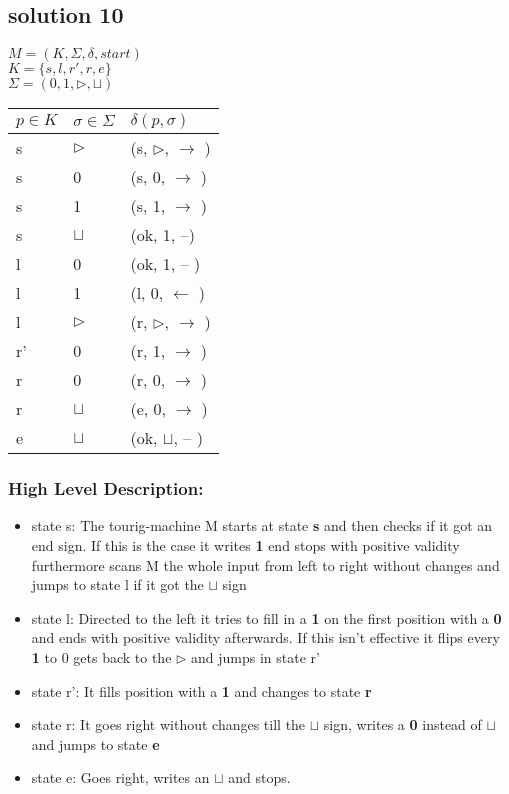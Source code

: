 \subsection{solution 10}

$M=(K,\Sigma, \delta, start)$\\
$K=\{s, l, r', r, e\}$\\
$\Sigma=(0,1,\triangleright, \sqcup)$

\begin{center}
\begin{tabular}[t]{| l | l | l |}
\hline
$p \in K$ & $\sigma \in \Sigma $ & $ \delta ( p, \sigma ) $ \\ \hline
s & $\triangleright$ & (s, $\triangleright$, $\rightarrow$ )\\ 
s & 0 & (s, 0, $\rightarrow$ )\\ 
s & 1 & (s, 1, $\rightarrow$ )\\ 
s & $\sqcup$ & (ok, 1, --)\\ \hline
l & 0 & (ok, 1, -- )\\ 
l & 1 & (l, 0, $\leftarrow$ )\\ 
l & $\triangleright$ & (r, $\triangleright$, $\rightarrow$ )\\ \hline
r' & 0 & (r, 1, $\rightarrow$ )\\ \hline
r & 0 & (r, 0, $\rightarrow$ )\\ 
r & $\sqcup$ & (e, 0, $\rightarrow$ )\\ \hline
e & $\sqcup$ & (ok, $\sqcup$, -- )\\ \hline
\end{tabular} 
\end{center}

\subsubsection{High Level Description:}
\begin{itemize}
\item state s:
The tourig-machine M starts at state \textbf{s} and then checks if it got an end sign.
If this is the case it writes \textbf{1} end stops with positive validity 
furthermore scans M the whole input from left to right without changes and jumps to state
l if it got the $\sqcup$ sign
\item state l:
Directed to the left it tries to fill in a \textbf{1} on the first position with a \textbf{0}
and ends with positive validity afterwards.
If this isn't effective it flips every \textbf{1} to 0 
gets back to the $\triangleright$ and jumps in state r'
\item state r':
It fills position with a \textbf{1} and changes to state \textbf{r}
\item state r: 
It goes right without changes till the $\sqcup$ sign, writes a \textbf{0} 
instead of $\sqcup$ and jumps to state \textbf{e}
\item state e:
Goes right, writes an $\sqcup$ and stops.

\end{itemize}
